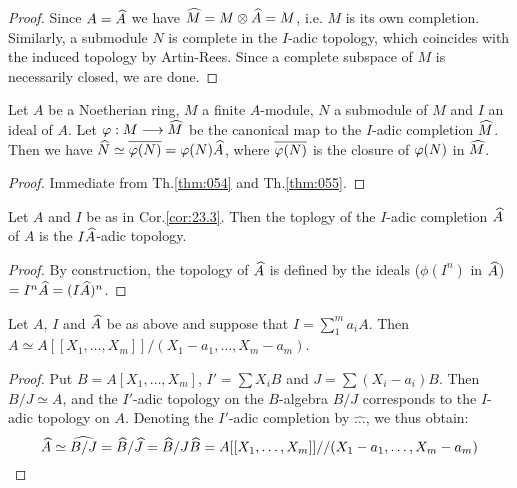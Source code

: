 \documentclass[../main]{subfiles}
\begin{document}
\begin{proof}
Since $A = \widehat{A}$ we have $\widehat{M} = M \otimes \widehat{A} = M$, i.e. $M$ is its own completion. Similarly, a submodule $N$ is complete in the $I$-adic topology, which coincides with the induced topology by Artin-Rees. Since a complete subspace of $M$ is necessarily closed, we are done.
\end{proof}

\begin{corollary}
\label{cor:23.3}
Let $A$ be a Noetherian ring, $M$ a finite $A$-module, $N$ a submodule of $M$ and $I$ an ideal of $A$. Let $\varphi : M \longrightarrow \widehat{M}$ be the canonical map to the $I$-adic completion $\widehat{M}$. Then we have $\widehat{N} \simeq \overline {\varphi(N)} = \varphi(N)\widehat{A}$, where $\overline {\varphi(N)}$ is the closure of $\varphi(N)$ in $\widehat{M}$. 
\end{corollary}

\begin{proof}
Immediate from Th.\ref{thm:054} and Th.\ref{thm:055}. 
\end{proof}

\begin{corollary}
Let $A$ and $I$ be as in Cor.\ref{cor:23.3}. Then the toplogy of the $I$-adic completion $\widehat{A}$ of $A$ is the $I \widehat{A}$-adic topology. 
\end{corollary}

\begin{proof}
By construction, the topology of $\widehat{A}$ is defined by the ideals ($\phi(I^n)$ in $\widehat{A}$) $= I^n \widehat{A} = (I \widehat{A})^n$.
\end{proof}

\begin{corollary}
Let $A$, $I$ and $\widehat{A}$ be as above and suppose that $I = \sum\limits_1^m a_i A$. Then $A \simeq A[[X_1, \ldots, X_m]]/(X_1 - a_1, \ldots, X_m - a_m)$. 
\end{corollary}

\begin{proof}
Put $B = A[X_1, \ldots, X_m]$, $I' = \sum X_i B$ and $J = \sum (X_i - a_i)B$. Then $B/J \simeq A$, and the $I'$-adic topology on the $B$-algebra $B/J$ corresponds to the $I$-adic topology on $A$. Denoting the $I'$-adic completion by $\widehat {\ldots}$, we thus obtain: 
\[
\widehat{A} \simeq \widehat {B/J} = \widehat B/\widehat J = \widehat B/J \widehat B = A[[X_1, \dots, X_m]]//(X_1 - a_1, \dots, X_m - a_m)
\]
\end{proof}
\end{document}
